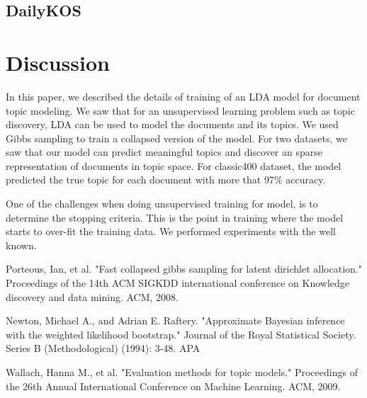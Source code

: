\documentclass[twoside,12pt]{article}
\begin{document}
\subsection{DailyKOS}

\section{Discussion}
In this paper, we described the details of training of an LDA model for document topic modeling. We saw that for an unsupervised learning problem such as topic discovery, LDA can be used to model the documents and its topics. We used Gibbs sampling to train a collapsed version of the model. For two datasets, we saw that our model can predict meaningful topics and discover an sparse representation of documents in topic space. For classic400 dataset, the model predicted the true topic for each document with more that 97\% accuracy.

One of the challenges when doing unsupervised training for model, is to determine the stopping criteria. This is the point in training where the model starts to over-fit the training data. We performed experiments with the well known.

\begin{thebibliography}{9}
Porteous, Ian, et al. "Fast collapsed gibbs sampling for latent dirichlet allocation." Proceedings of the 14th ACM SIGKDD international conference on Knowledge discovery and data mining. ACM, 2008.


Newton, Michael A., and Adrian E. Raftery. "Approximate Bayesian inference with the weighted likelihood bootstrap." Journal of the Royal Statistical Society. Series B (Methodological) (1994): 3-48.
APA	

Wallach, Hanna M., et al. "Evaluation methods for topic models." Proceedings of the 26th Annual International Conference on Machine Learning. ACM, 2009.

\end{thebibliography}
\end{document}
